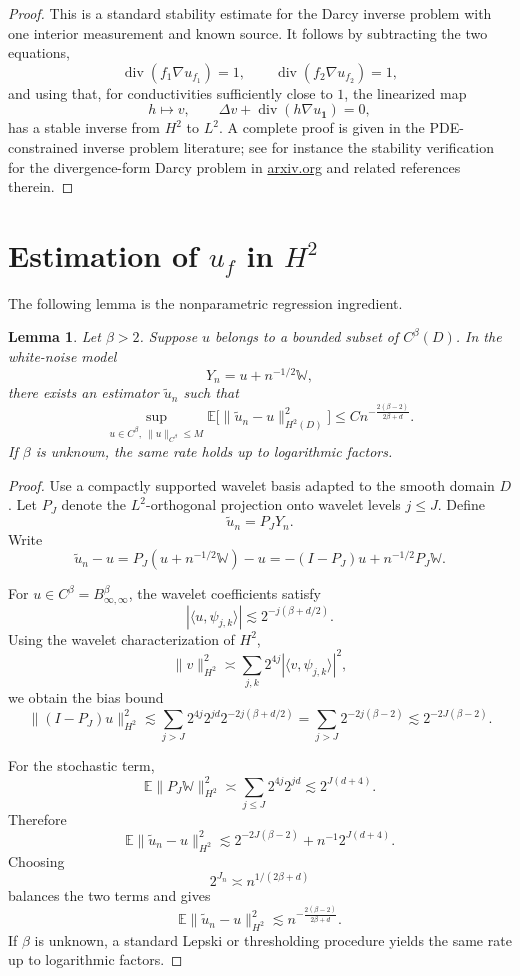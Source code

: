 \documentclass[11pt]{article}
\theoremstyle{plain}
\newtheorem{lemma}[theorem]{Lemma}
\theoremstyle{definition}
\newcommand{\E}{\mathbb E}
\newcommand{\1}{\mathbf 1}
\DeclareMathOperator{\divg}{div}
\begin{document}
\begin{proof}
This is a standard stability estimate for the Darcy inverse problem with one interior measurement and known source. It follows by subtracting the two equations,
\[
\divg(f_1\nabla u_{f_1})=1,
\qquad
\divg(f_2\nabla u_{f_2})=1,
\]
and using that, for conductivities sufficiently close to \(1\), the linearized map
\[
h\mapsto v,\qquad
\Delta v + \divg(h\nabla u_{\1})=0,
\]
has a stable inverse from \(H^2\) to \(L^2\). A complete proof is given in the PDE-constrained inverse problem literature; see for instance the stability verification for the divergence-form Darcy problem in
\href{https://export.arxiv.org/pdf/1809.08818v3.pdf}{arxiv.org}
and related references therein.
\end{proof}

\section{Estimation of \(u_f\) in \(H^2\)}

The following lemma is the nonparametric regression ingredient.

\begin{lemma}
\label{lem:u-h2-rate}
Let \(\beta>2\). Suppose \(u\) belongs to a bounded subset of \(C^\beta(D)\). In the white-noise model
\[
Y_n = u + n^{-1/2}\mathbb W,
\]
there exists an estimator \(\tilde u_n\) such that
\[
\sup_{u\in C^\beta,\ \|u\|_{C^\beta}\le M}
\E\bigl[\|\tilde u_n-u\|_{H^2(D)}^2\bigr]
\le
C n^{-\frac{2(\beta-2)}{2\beta+d}}.
\]
If \(\beta\) is unknown, the same rate holds up to logarithmic factors.
\end{lemma}

\begin{proof}
Use a compactly supported wavelet basis adapted to the smooth domain \(D\). Let \(P_J\) denote the \(L^2\)-orthogonal projection onto wavelet levels \(j\le J\). Define
\[
\tilde u_n=P_JY_n.
\]
Write
\[
\tilde u_n-u = P_J(u+n^{-1/2}\mathbb W)-u
= -(I-P_J)u + n^{-1/2}P_J\mathbb W.
\]

For \(u\in C^\beta=B_{\infty,\infty}^\beta\), the wavelet coefficients satisfy
\[
|\langle u,\psi_{j,k}\rangle|
\lesssim
2^{-j(\beta+d/2)}.
\]
Using the wavelet characterization of \(H^2\),
\[
\|v\|_{H^2}^2
\asymp
\sum_{j,k}2^{4j}|\langle v,\psi_{j,k}\rangle|^2,
\]
we obtain the bias bound
\[
\|(I-P_J)u\|_{H^2}^2
\lesssim
\sum_{j>J}2^{4j}2^{jd}2^{-2j(\beta+d/2)}
=
\sum_{j>J}2^{-2j(\beta-2)}
\lesssim
2^{-2J(\beta-2)}.
\]

For the stochastic term,
\[
\E\|P_J\mathbb W\|_{H^2}^2
\asymp
\sum_{j\le J}2^{4j}2^{jd}
\lesssim
2^{J(d+4)}.
\]
Therefore
\[
\E\|\tilde u_n-u\|_{H^2}^2
\lesssim
2^{-2J(\beta-2)} + n^{-1}2^{J(d+4)}.
\]
Choosing
\[
2^{J_n}\asymp n^{1/(2\beta+d)}
\]
balances the two terms and gives
\[
\E\|\tilde u_n-u\|_{H^2}^2
\lesssim
n^{-\frac{2(\beta-2)}{2\beta+d}}.
\]
If \(\beta\) is unknown, a standard Lepski or thresholding procedure yields the same rate up to logarithmic factors.
\end{proof}
\end{document}
